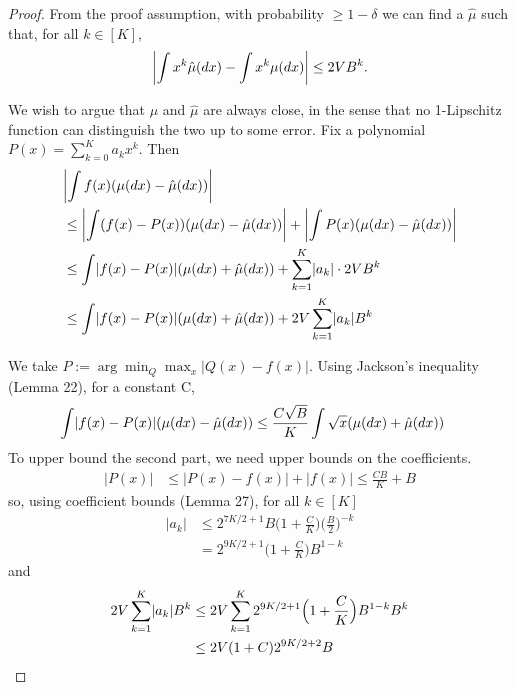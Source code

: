 \documentclass{article}
\theoremstyle{definition}
\DeclarePairedDelimiter{\abs}{\lvert}{\rvert}
\begin{document}
\begin{proof}
From the proof assumption, with probability $\geq 1-\delta$ we can find a $\hat{\mu}$ such that, for all $k \in [K]$,
\begin{align*}
    \abs*{\int x^k\hat{\mu}(dx) - \int x^k \mu(dx)} \leq 2VB^k.
\end{align*}

We wish to argue that $\mu$ and $\hat{\mu}$ are always close, in the sense that no 1-Lipschitz function can distinguish the two up to some error.
Fix a polynomial $P(x) = \sum_{k=0}^K a_kx^k$.
Then
\begin{align*}
    &\abs*{\int f(x)(\mu(dx) - \hat{\mu}(dx))} \\
    & \leq \abs*{\int (f(x) - P(x))(\mu(dx) - \hat{\mu}(dx))} + \abs*{\int P(x)(\mu(dx) - \hat{\mu}(dx))} \\
    & \leq \int \abs{f(x) - P(x)}(\mu(dx) + \hat{\mu}(dx)) + \sum_{k=1}^K \abs{a_k}\cdot 2 VB^k \\
    & \leq \int \abs{f(x) - P(x)}(\mu(dx) + \hat{\mu}(dx)) + 2V \sum_{k=1}^K \abs{a_k}B^k
\end{align*}

We take $P := \arg\min_Q \max_x |Q(x) - f(x)|$.
Using Jackson's inequality (Lemma 22), for a constant C,
\begin{align*}
    \int \abs{f(x) - P(x)}(\mu(dx) - \hat{\mu}(dx))
    & \leq \frac{C\sqrt{B}}{K}\int \sqrt{x}(\mu(dx) + \hat{\mu}(dx))
\end{align*}
To upper bound the second part, we need upper bounds on the coefficients.
\begin{align*}
    |P(x)| &\leq |P(x) - f(x)| + |f(x)|
    \leq \frac{CB}{K} + B
\end{align*}
so, using coefficient bounds (Lemma 27), for all $k \in [K]$
\begin{align*}
    |a_k| &\leq 2^{7K/2 + 1}B\Big(1 + \frac CK\Big)\Big(\frac{B}{2}\Big)^{-k} \\
    &= 2^{9K/2 + 1}\Big(1 + \frac CK\Big)B^{1-k}
\end{align*}
and
\begin{align*}
    2V\sum_{k=1}^K \abs{a_k}B^k
    &\leq 2V\sum_{k=1}^K 2^{9K/2 + 1}\Big(1 + \frac CK\Big)B^{1-k}B^k \\
    &\leq 2V(1+C)2^{9K/2 + 2}B
\end{align*}


\end{proof}
\end{document}
